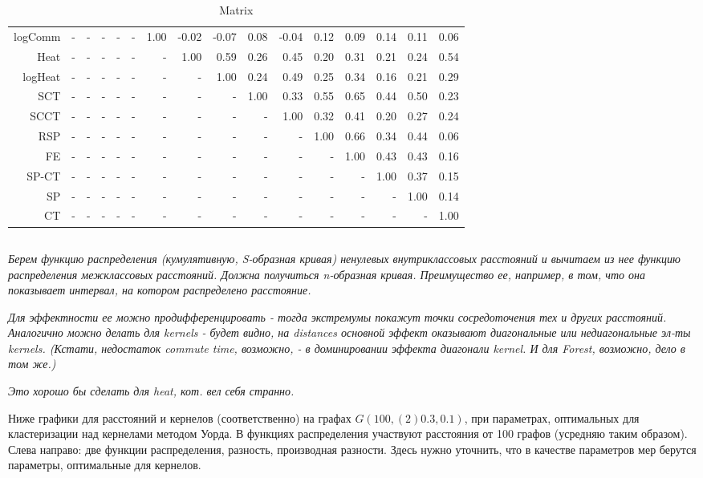 \documentclass{article}
\begin{document}
\begin{table}[H]
{\begin{tabular}{r|rrrrrrrrrrrrrrr}
logComm & - & - & - & - & - & 1.00 & -0.02 & -0.07 & 0.08 & -0.04 & 0.12 & 0.09 & 0.14 & 0.11 & 0.06\\
Heat & - & - & - & - & - & - & 1.00 & 0.59 & 0.26 & 0.45 & 0.20 & 0.31 & 0.21 & 0.24 & 0.54\\
logHeat & - & - & - & - & - & - & - & 1.00 & 0.24 & 0.49 & 0.25 & 0.34 & 0.16 & 0.21 & 0.29\\
SCT & - & - & - & - & - & - & - & - & 1.00 & 0.33 & 0.55 & 0.65 & 0.44 & 0.50 & 0.23\\
SCCT & - & - & - & - & - & - & - & - & - & 1.00 & 0.32 & 0.41 & 0.20 & 0.27 & 0.24\\
RSP & - & - & - & - & - & - & - & - & - & - & 1.00 & 0.66 & 0.34 & 0.44 & 0.06\\
FE & - & - & - & - & - & - & - & - & - & - & - & 1.00 & 0.43 & 0.43 & 0.16\\
SP-CT & - & - & - & - & - & - & - & - & - & - & - & - & 1.00 & 0.37 & 0.15\\
SP & - & - & - & - & - & - & - & - & - & - & - & - & - & 1.00 & 0.14\\
CT & - & - & - & - & - & - & - & - & - & - & - & - & - & - & 1.00\\
		\bottomrule
	\end{tabular}
	\caption{\label{t_CopComp} Matrix}
}\end{table}

\subsection{}
\textit{Берем функцию распределения (кумулятивную, S-образная кривая) ненулевых внутриклассовых расстояний и вычитаем из нее функцию распределения межклассовых расстояний. Должна получиться n-образная кривая. Преимущество ее, например, в том, что она показывает интервал, на котором распределено расстояние.}

\textit{Для эффектности ее можно продифференцировать - тогда экстремумы покажут точки сосредоточения тех и других расстояний. Аналогично можно делать для kernels - будет видно, на distances основной эффект оказывают диагональные или недиагональные эл-ты kernels. (Кстати, недостаток commute time, возможно, - в доминировании эффекта диагонали kernel. И для Forest, возможно, дело в том же.)}

\textit{Это хорошо бы сделать для heat, кот. вел себя странно.}

Ниже графики для расстояний и кернелов (соответственно) на графах $G(100, (2)0.3, 0.1)$, при параметрах, оптимальных для кластеризации над кернелами методом Уорда. В функциях распределения участвуют расстояния от 100 графов (усредняю таким образом).
Слева направо: две функции распределения, разность, производная разности.
Здесь нужно уточнить, что в качестве параметров мер берутся параметры, оптимальные для кернелов.
\end{document}
